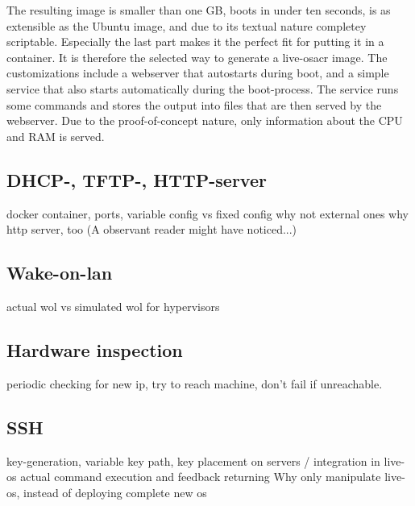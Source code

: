 The resulting image is smaller than one GB, boots in under ten seconds, is as extensible as the Ubuntu image, and due to its textual nature completey scriptable. Especially the last part makes it the perfect fit for putting it in a container. It is therefore the selected way to generate a live-\gls{osacr} image.
\newline
The customizations include a webserver that autostarts during boot, and a simple service that also starts automatically during the boot-process. The service runs some commands and stores the output into files that are then served by the webserver. Due to the proof-of-concept nature, only information about the CPU and RAM is served.

\subsection{DHCP-, TFTP-, HTTP-server}
docker container, ports, variable config vs fixed config
\newline
why not external ones
\newline
why http server, too (A observant reader might have noticed...)

\subsection{Wake-on-lan}
actual wol vs simulated wol for hypervisors

\subsection{Hardware inspection}
periodic checking for new ip, try to reach machine, don't fail if unreachable.

\subsection{SSH}
key-generation, variable key path, key placement on servers / integration in live-os
\newline
actual command execution and feedback returning
\newline
Why only manipulate live-os, instead of deploying complete new os
